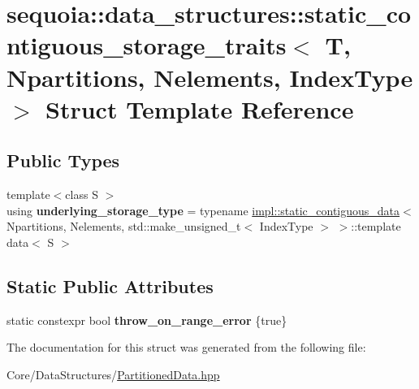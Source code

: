 \hypertarget{structsequoia_1_1data__structures_1_1static__contiguous__storage__traits}{}\section{sequoia\+::data\+\_\+structures\+::static\+\_\+contiguous\+\_\+storage\+\_\+traits$<$ T, Npartitions, Nelements, Index\+Type $>$ Struct Template Reference}
\label{structsequoia_1_1data__structures_1_1static__contiguous__storage__traits}
\subsection*{Public Types}
\begin{DoxyCompactItemize}
\item 
\mbox{\label{structsequoia_1_1data__structures_1_1static__contiguous__storage__traits_a08f0258b6a7049ffb51cae963573a154}} 
{\footnotesize template$<$class S $>$ }\\using {\bfseries underlying\+\_\+storage\+\_\+type} = typename \mbox{\hyperlink{structsequoia_1_1data__structures_1_1impl_1_1static__contiguous__data}{impl\+::static\+\_\+contiguous\+\_\+data}}$<$ Npartitions, Nelements, std\+::make\+\_\+unsigned\+\_\+t$<$ Index\+Type $>$ $>$\+::template data$<$ S $>$
\end{DoxyCompactItemize}
\subsection*{Static Public Attributes}
\begin{DoxyCompactItemize}
\item 
\mbox{\label{structsequoia_1_1data__structures_1_1static__contiguous__storage__traits_a72caf0bceb7f48644fdfa2836b290e81}} 
static constexpr bool {\bfseries throw\+\_\+on\+\_\+range\+\_\+error} \{true\}
\end{DoxyCompactItemize}


The documentation for this struct was generated from the following file\+:\begin{DoxyCompactItemize}
\item 
Core/\+Data\+Structures/\mbox{\hyperlink{_partitioned_data_8hpp}{Partitioned\+Data.\+hpp}}\end{DoxyCompactItemize}
